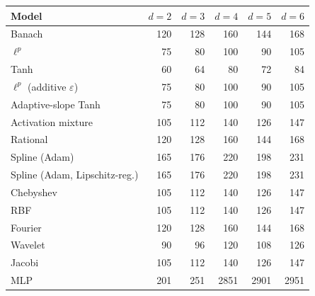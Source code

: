 \begin{tabular}{lrrrrr}
\toprule
Model & $d=2$ & $d=3$ & $d=4$ & $d=5$ & $d=6$ \\
\midrule
Banach & 120 & 128 & 160 & 144 & 168 \\
$\ell^p$ & 75 & 80 & 100 & 90 & 105 \\
Tanh & 60 & 64 & 80 & 72 & 84 \\
$\ell^p$ (additive $\varepsilon$) & 75 & 80 & 100 & 90 & 105 \\
Adaptive-slope Tanh & 75 & 80 & 100 & 90 & 105 \\
Activation mixture & 105 & 112 & 140 & 126 & 147 \\
Rational & 120 & 128 & 160 & 144 & 168 \\
Spline (Adam) & 165 & 176 & 220 & 198 & 231 \\
Spline (Adam, Lipschitz-reg.) & 165 & 176 & 220 & 198 & 231 \\
Chebyshev & 105 & 112 & 140 & 126 & 147 \\
RBF & 105 & 112 & 140 & 126 & 147 \\
Fourier & 120 & 128 & 160 & 144 & 168 \\
Wavelet & 90 & 96 & 120 & 108 & 126 \\
Jacobi & 105 & 112 & 140 & 126 & 147 \\
MLP & 201 & 251 & 2851 & 2901 & 2951 \\
\bottomrule
\end{tabular}
